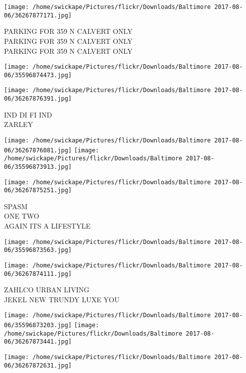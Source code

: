 \documentclass[10pt,letterpaper]{article}
\begin{document}
\texttt{[image: /home/swickape/Pictures/flickr/Downloads/Baltimore 2017-08-06/36267877171.jpg]}

PARKING FOR 359 N CALVERT ONLY\\
PARKING FOR 359 N CALVERT ONLY\\
PARKING FOR 359 N CALVERT ONLY\\
\pagebreak

\texttt{[image: /home/swickape/Pictures/flickr/Downloads/Baltimore 2017-08-06/35596874473.jpg]}

\vspace{0.25in}
\texttt{[image: /home/swickape/Pictures/flickr/Downloads/Baltimore 2017-08-06/36267876391.jpg]}

IND DI FI IND\\
ZARLEY\\
\pagebreak

\texttt{[image: /home/swickape/Pictures/flickr/Downloads/Baltimore 2017-08-06/36267876081.jpg]}
\texttt{[image: /home/swickape/Pictures/flickr/Downloads/Baltimore 2017-08-06/35596873913.jpg]}

\vspace{0.25in}
\texttt{[image: /home/swickape/Pictures/flickr/Downloads/Baltimore 2017-08-06/36267875251.jpg]}

SPASM\\
ONE TWO\\
AGAIN ITS A LIFESTYLE\\
\pagebreak

\texttt{[image: /home/swickape/Pictures/flickr/Downloads/Baltimore 2017-08-06/35596873563.jpg]}

\vspace{0.25in}
\texttt{[image: /home/swickape/Pictures/flickr/Downloads/Baltimore 2017-08-06/36267874111.jpg]}

ZAHLCO URBAN LIVING\\
JEKEL NEW TRUNDY LUXE YOU\\
\pagebreak

\texttt{[image: /home/swickape/Pictures/flickr/Downloads/Baltimore 2017-08-06/35596873203.jpg]}
\texttt{[image: /home/swickape/Pictures/flickr/Downloads/Baltimore 2017-08-06/36267873441.jpg]}

\vspace{0.25in}
\texttt{[image: /home/swickape/Pictures/flickr/Downloads/Baltimore 2017-08-06/36267872631.jpg]}
\end{document}

